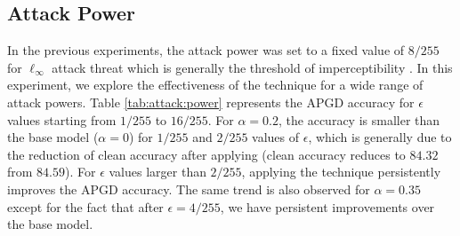 \documentclass[conference]{IEEEtran}
\begin{document}
\subsection{Attack Power}\label{abl:power}
In the previous experiments, the attack power was set to a fixed value of $8/255$ for $\ell_\infty$ attack threat which is generally the threshold of imperceptibility \cite{reoch20}. In this experiment, we explore the effectiveness of the \sys technique for a wide range of attack powers. Table \ref{tab:attack:power} represents the APGD accuracy for $\epsilon$ values starting from $1/255$ to $16/255$. For $\alpha=0.2$, the accuracy is smaller than the base model ($\alpha=0$) for $1/255$ and $2/255$ values of $\epsilon$, which is generally due to the reduction of clean accuracy after applying \sys (clean accuracy reduces to $84.32$ from $84.59$). For $\epsilon$ values larger than $2/255$, applying the \sys technique persistently improves the APGD accuracy. The same trend is also observed for $\alpha=0.35$ except for the fact that after $\epsilon=4/255$, we have persistent improvements over the base model.
\end{document}
